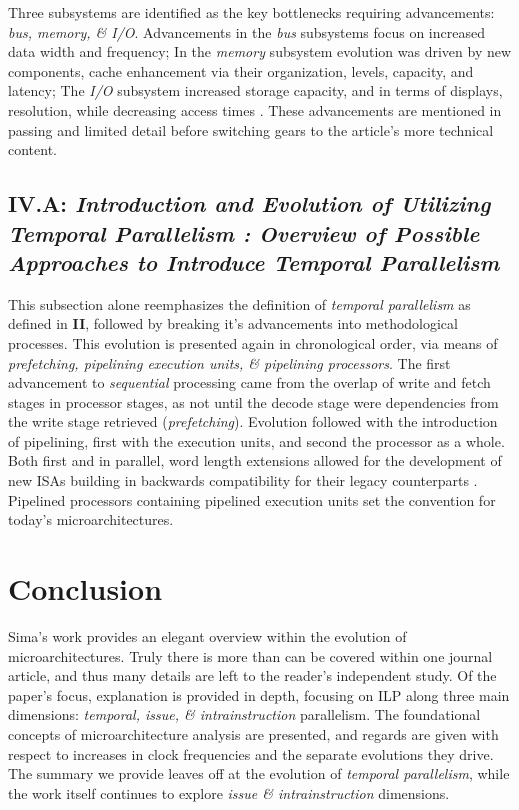 \documentclass{article}
\begin{document}
Three subsystems are identified as the key bottlenecks requiring advancements: \emph{bus, memory, \& I/O}.
Advancements in the \emph{bus} subsystems focus on increased data width and frequency; In the \emph{memory} subsystem evolution was driven by new components, cache enhancement via their organization, levels, capacity, and latency; The \emph{I/O} subsystem increased storage capacity, and in terms of displays, resolution, while decreasing access times \cite{Sima}. 
These advancements are mentioned in passing and limited detail before switching gears to the article's more technical content.

\subsection{\textbf{IV.A}: \emph{Introduction and Evolution of Utilizing Temporal Parallelism : Overview of Possible Approaches to Introduce Temporal Parallelism}}
This subsection alone reemphasizes the definition of \emph{temporal parallelism} as defined in \textbf{II}, followed by breaking it's advancements into methodological processes. 
This evolution is presented again in chronological order, via means of \emph{prefetching, pipelining execution units, \& pipelining processors}. 
The first advancement to \emph{sequential} processing came from the overlap of write and fetch stages in processor stages, as not until the decode stage were dependencies from the write stage retrieved (\emph{prefetching}). 
Evolution followed with the introduction of pipelining, first with the execution units, and second the processor as a whole. 
Both first and in parallel, word length extensions allowed for the development of new ISAs building in backwards compatibility for their legacy counterparts \cite{Sima}. 
Pipelined processors containing pipelined execution units set the convention for today's microarchitectures.

\section{Conclusion}
Sima's work provides an elegant overview within the evolution of microarchitectures. 
Truly there is more than can be covered within one journal article, and thus many details are left to the reader's independent study. 
Of the paper's focus, explanation is provided in depth, focusing on ILP along three main dimensions: \emph{temporal, issue, \& intrainstruction} parallelism. 
The foundational concepts of microarchitecture analysis are presented, and regards are given with respect to increases in clock frequencies and the separate evolutions they drive.
The summary we provide leaves off at the evolution of \emph{temporal parallelism}, while the work itself continues to explore \emph{issue \& intrainstruction} dimensions. 

\newpage

{}
\end{document}
